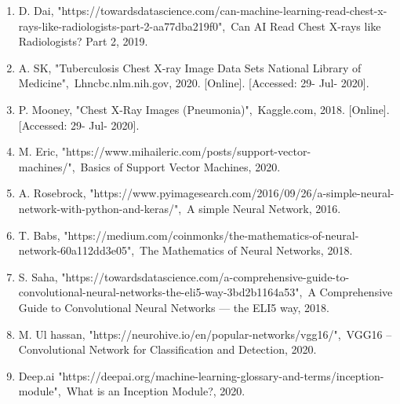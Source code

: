 \documentclass{article} %
\begin{document}
\begin{enumerate}
\item  D. Dai, "https://towardsdatascience.com/can-machine-learning-read-chest-x-rays-like-radiologists-part-2-aa77dba219f0",~Can AI Read Chest X-rays like Radiologists? Part 2, 2019.

\item  A. SK, "Tuberculosis Chest X-ray Image Data Sets {\textbar} National Library of Medicine",~Lhncbc.nlm.nih.gov, 2020. [Online]. [Accessed: 29- Jul- 2020].

\item  P. Mooney, "Chest X-Ray Images (Pneumonia)",~Kaggle.com, 2018. [Online]. [Accessed: 29- Jul- 2020].

\item  M. Eric, "https://www.mihaileric.com/posts/support-vector-machines/",~Basics of Support Vector Machines, 2020.

\item   A. Rosebrock, "https://www.pyimagesearch.com/2016/09/26/a-simple-neural-network-with-python-and-keras/",~A simple Neural Network, 2016.

\item   T. Babs, "https://medium.com/coinmonks/the-mathematics-of-neural-network-60a112dd3e05",~The Mathematics of Neural Networks, 2018.

\item   S. Saha, "https://towardsdatascience.com/a-comprehensive-guide-to-convolutional-neural-networks-the-eli5-way-3bd2b1164a53",~A Comprehensive Guide to Convolutional Neural Networks --- the ELI5 way, 2018.

\item   M. Ul hassan, "https://neurohive.io/en/popular-networks/vgg16/",~VGG16 -- Convolutional Network for Classification and Detection, 2020.

\item   Deep.ai "https://deepai.org/machine-learning-glossary-and-terms/inception-module",~What is an Inception Module?, 2020.
\end{enumerate}
\end{document}
